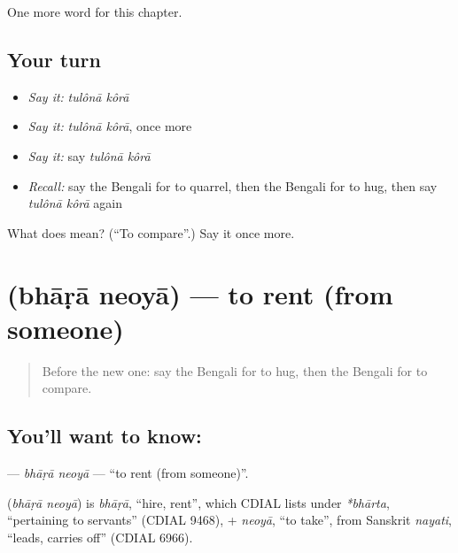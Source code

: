 \begin{grammarlens}[title={What you've built}]
One more word for this chapter.
\end{grammarlens}

\subsection*{Your turn}
\begin{itemize}
\raggedright
  \item \emph{Say it:} \emph{tulônā kôrā}
  \item \emph{Say it:} \emph{tulônā kôrā}, once more
  \item \emph{Say it:} say \emph{tulônā kôrā}
  \item \emph{Recall:} say the Bengali for to quarrel, then the Bengali for to hug, then say \emph{tulônā kôrā} again
\end{itemize}

\begin{tcolorbox}[breakable,colback=teal!4,colframe=teal!35!black,title={Before you move on}]
What does   mean? (\textquotedblleft{}To compare\textquotedblright{}.) Say it once more.
\end{tcolorbox}
\section[\texorpdfstring{\bn{ভাড়া} \bn{নেওয়া} (bhāṛā neoyā)}{ভাড়া নেওয়া (bhāṛā neoyā)}]{  (bhāṛā neoyā) — to rent (from someone)}

\label{lesson:BN-C212-bhara-neoya}



\begin{quote}
Before the new one: say the Bengali for to hug, then the Bengali for to compare.
\end{quote}

\subsection*{You'll want to know:  }
\textbf{ } — \emph{bhāṛā neoyā} — \textquotedblleft{}to rent (from someone)\textquotedblright{}.

\begin{cousinweb}
\textbf{ } (\emph{bhāṛā neoyā}) is \emph{bhāṛā}, \textquotedblleft{}hire, rent\textquotedblright{}, which CDIAL lists under \emph{*bhārta}, \textquotedblleft{}pertaining to servants\textquotedblright{} (CDIAL 9468), + \emph{neoyā}, \textquotedblleft{}to take\textquotedblright{}, from Sanskrit \emph{nayati}, \textquotedblleft{}leads, carries off\textquotedblright{} (CDIAL 6966).
\end{cousinweb}


